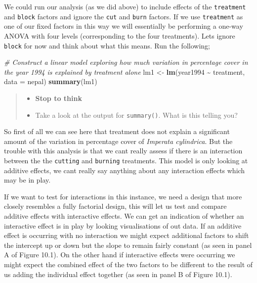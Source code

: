 \documentclass[
]{book}
\newenvironment{Shaded}{\begin{snugshade}}{\end{snugshade}}
\newcommand{\AttributeTok}[1]{\textcolor[rgb]{0.13,0.29,0.53}{#1}}
\newcommand{\CommentTok}[1]{\textcolor[rgb]{0.56,0.35,0.01}{\textit{#1}}}
\newcommand{\FunctionTok}[1]{\textcolor[rgb]{0.13,0.29,0.53}{\textbf{#1}}}
\newcommand{\NormalTok}[1]{#1}
\newcommand{\OtherTok}[1]{\textcolor[rgb]{0.56,0.35,0.01}{#1}}
\newcommand{\SpecialCharTok}[1]{\textcolor[rgb]{0.81,0.36,0.00}{\textbf{#1}}}
\providecommand{\tightlist}{%
  \setlength{\itemsep}{0pt}\setlength{\parskip}{0pt}}
\begin{document}
We could run our analysis (as we did above) to include effects of the \texttt{treatment} and \texttt{block} factors and ignore the \texttt{cut} and \texttt{burn} factors. If we use \texttt{treatment} as one of our fixed factors in this way we will essentially be performing a one-way ANOVA with four levels (corresponding to the four treatments). Lets ignore \texttt{block} for now and think about what this means. Run the following;

\begin{Shaded}
\begin{Highlighting}[]
\CommentTok{\# Construct a linear model exploring how much variation in percentage cover in the year 1994 is explained by treatment alone }
\NormalTok{lm1 }\OtherTok{\textless{}{-}} \FunctionTok{lm}\NormalTok{(year1994 }\SpecialCharTok{\textasciitilde{}}\NormalTok{ treatment, }\AttributeTok{data =}\NormalTok{ nepal)}
\FunctionTok{summary}\NormalTok{(lm1)}
\end{Highlighting}
\end{Shaded}

\begin{quote}
\begin{itemize}
\tightlist
\item
  \textbf{Stop to think}
\item
  Take a look at the output for \texttt{summary()}. What is this telling you?
\end{itemize}
\end{quote}

So first of all we can see here that treatment does not explain a significant amount of the variation in percentage cover of \emph{Imperata cylindrica}. But the trouble with this analysis is that we cant really assess if there is an interaction between the the \texttt{cutting} and \texttt{burning} treatments. This model is only looking at additive effects, we cant really say anything about any interaction effects which may be in play.

If we want to test for interactions in this instance, we need a design that more closely resembles a fully factorial design, this will let us test and compare additive effects with interactive effects. We can get an indication of whether an interactive effect is in play by looking visualisations of out data. If an additive effect is occurring with no interaction we might expect additional factors to shift the intercept up or down but the slope to remain fairly constant (as seen in panel A of Figure 10.1). On the other hand if interactive effects were occurring we might expect the combined effect of the two factors to be different to the result of us adding the individual effect together (as seen in panel B of Figure 10.1).
\end{document}
